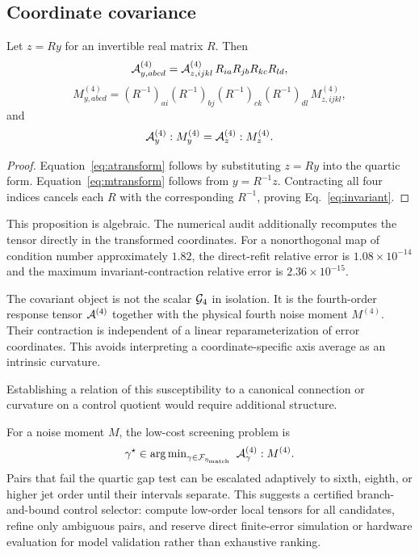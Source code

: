 \subsection{Coordinate covariance}

\begin{proposition}\label{prop:covariance}
Let $z=Ry$ for an invertible real matrix $R$. Then
\begin{equation}\label{eq:atransform}
\mathcal{A}^{(4)}_{y,abcd}=\mathcal{A}^{(4)}_{z,ijkl}\,R_{ia}R_{jb}R_{kc}R_{ld},
\end{equation}
\begin{equation}\label{eq:mtransform}
M^{(4)}_{y,abcd}=(R^{-1})_{ai}(R^{-1})_{bj}(R^{-1})_{ck}(R^{-1})_{dl}\,M^{(4)}_{z,ijkl},
\end{equation}
and
\begin{equation}\label{eq:invariant}
\mathcal{A}^{(4)}_{y}:M^{(4)}_{y}=\mathcal{A}^{(4)}_{z}:M^{(4)}_{z}.
\end{equation}
\end{proposition}

\begin{proof}
Equation~\eqref{eq:atransform} follows by substituting $z=Ry$ into the quartic form.
Equation~\eqref{eq:mtransform} follows from $y=R^{-1}z$. Contracting all four indices
cancels each $R$ with the corresponding $R^{-1}$, proving Eq.~\eqref{eq:invariant}.
\end{proof}

This proposition is algebraic. The numerical audit additionally recomputes the tensor
directly in the transformed coordinates. For a nonorthogonal map of condition number
approximately $1.82$, the direct-refit relative error is $1.08\times10^{-14}$ and the
maximum invariant-contraction relative error is $2.36\times10^{-15}$.

The covariant object is not the scalar $\mathcal{G}_{4}$ in isolation. It is the fourth-order
response tensor $\mathcal{A}^{(4)}$ together with the physical fourth noise moment $M^{(4)}$. Their
contraction is independent of a linear reparameterization of error coordinates. This avoids
interpreting a coordinate-specific axis average as an intrinsic curvature.

Establishing a relation of this susceptibility to a canonical connection or curvature on a
control quotient would require additional structure.

For a noise moment $M$, the low-cost screening problem is
\[
\gamma^{\star}\in\argmin_{\gamma\in\Ff_{\eta_{\mathrm{match}}}}\ \Aa^{(4)}_{\gamma}:M^{(4)}.
\]
Pairs that fail the quartic gap test can be escalated adaptively to sixth, eighth, or
higher jet order until their intervals separate. This suggests a certified branch-and-bound
control selector: compute low-order local tensors for all candidates, refine only ambiguous
pairs, and reserve direct finite-error simulation or hardware evaluation for model
validation rather than exhaustive ranking.

